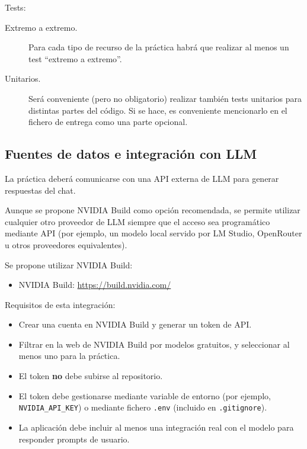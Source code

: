 Tests:

\begin{description}
\item[Extremo a extremo.] Para cada tipo de recurso de la práctica habrá que realizar al menos un test ``extremo a extremo''.
\item[Unitarios.] Será conveniente (pero no obligatorio) realizar también tests unitarios para distintas partes del código. Si se hace, es conveniente mencionarlo en el fichero de entrega como una parte opcional.
\end{description}

\subsection{Fuentes de datos e integración con LLM}
\label{sec:practica-2026-05:datos}

La práctica deberá comunicarse con una API externa de LLM para generar respuestas del chat.

Aunque se propone NVIDIA Build como opción recomendada, se permite utilizar cualquier otro proveedor de LLM siempre que el acceso sea programático mediante API (por ejemplo, un modelo local servido por LM Studio, OpenRouter u otros proveedores equivalentes).

Se propone utilizar NVIDIA Build:

\begin{itemize}
\item NVIDIA Build: \url{https://build.nvidia.com/}
\end{itemize}

Requisitos de esta integración:

\begin{itemize}
\item Crear una cuenta en NVIDIA Build y generar un token de API.
\item Filtrar en la web de NVIDIA Build por modelos gratuitos, y seleccionar al menos uno para la práctica.
\item El token \textbf{no} debe subirse al repositorio.
\item El token debe gestionarse mediante variable de entorno (por ejemplo, \verb|NVIDIA_API_KEY|) o mediante fichero \verb|.env| (incluido en \verb|.gitignore|).
\item La aplicación debe incluir al menos una integración real con el modelo para responder prompts de usuario.
\end{itemize}

